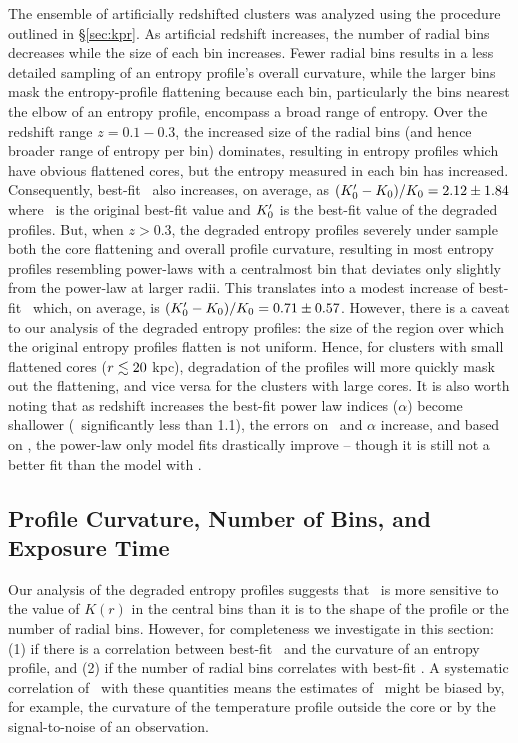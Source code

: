 \documentclass[12pt,preprint]{aastex}
\begin{document}
The ensemble of artificially redshifted clusters was analyzed using
the procedure outlined in \S\ref{sec:kpr}. As artificial redshift
increases, the number of radial bins decreases while the size of each
bin increases. Fewer radial bins results in a less detailed sampling
of an entropy profile's overall curvature, while the larger bins mask
the entropy-profile flattening because each bin, particularly the bins
nearest the elbow of an entropy profile, encompass a broad range of
entropy. Over the redshift range $z = 0.1-0.3$, the increased size of
the radial bins (and hence broader range of entropy per bin)
dominates, resulting in entropy profiles which have obvious flattened
cores, but the entropy measured in each bin has
increased. Consequently, best-fit \kna\ also increases, on average, as
$(K_0^{\prime}-K_0)/K_0 = 2.12 \pm 1.84$ where \kna\ is the original best-fit value and
$K_0^{\prime}$ is the best-fit value of the degraded profiles. But,
when $z > 0.3$, the degraded entropy profiles severely under sample
both the core flattening and overall profile curvature, resulting in
most entropy profiles resembling power-laws with a centralmost bin
that deviates only slightly from the power-law at larger radii. This
translates into a modest increase of best-fit \kna\ which, on average,
is $(K_0^{\prime}-K_0)/K_0 = 0.71 \pm 0.57$. However, there is a caveat to our analysis
of the degraded entropy profiles: the size of the region over which
the original entropy profiles flatten is not uniform. Hence, for
clusters with small flattened cores ($r \lesssim 20$ kpc), degradation of
the profiles will more quickly mask out the flattening, and vice versa
for the clusters with large cores. It is also worth noting that as
redshift increases the best-fit power law indices ($\alpha$) become
shallower (\ie\ significantly less than 1.1), the errors on \kna\ and
$\alpha$ increase, and based on \chisq, the power-law only model fits
drastically improve -- though it is still not a better fit than the
model with \kna.

\subsection{Profile Curvature, Number of Bins, and Exposure Time}
\label{sec:curve}

Our analysis of the degraded entropy profiles suggests that \kna\ is
more sensitive to the value of $K(r)$ in the central bins than it is
to the shape of the profile or the number of radial bins. However, for
completeness we investigate in this section: (1) if there is a
correlation between best-fit \kna\ and the curvature of an entropy
profile, and (2) if the number of radial bins correlates with best-fit
\kna. A systematic correlation of \kna\ with these quantities means
the estimates of \kna\ might be biased by, for example, the curvature
of the temperature profile outside the core or by the signal-to-noise
of an observation.
\end{document}
